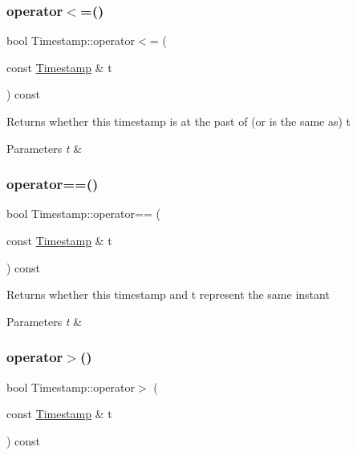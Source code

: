 \subsubsection{\texorpdfstring{operator$<$=()}{operator<=()}}
{\footnotesize\ttfamily bool Timestamp\+::operator$<$= (\begin{DoxyParamCaption}\item[{const \mbox{\hyperlink{class_d_utils_1_1_timestamp}{Timestamp}} \&}]{t }\end{DoxyParamCaption}) const}

Returns whether this timestamp is at the past of (or is the same as) t 
\begin{DoxyParams}{Parameters}
{\em t} & \\
\hline
\end{DoxyParams}
\mbox{\label{class_d_utils_1_1_timestamp_a42280e1193a6af2ac41362cf18a1185c}} 
\subsubsection{\texorpdfstring{operator==()}{operator==()}}
{\footnotesize\ttfamily bool Timestamp\+::operator== (\begin{DoxyParamCaption}\item[{const \mbox{\hyperlink{class_d_utils_1_1_timestamp}{Timestamp}} \&}]{t }\end{DoxyParamCaption}) const}

Returns whether this timestamp and t represent the same instant 
\begin{DoxyParams}{Parameters}
{\em t} & \\
\hline
\end{DoxyParams}
\mbox{\label{class_d_utils_1_1_timestamp_ad77ef43cab29f8f588bd47d74c1a8cce}} 
\subsubsection{\texorpdfstring{operator$>$()}{operator>()}}
{\footnotesize\ttfamily bool Timestamp\+::operator$>$ (\begin{DoxyParamCaption}\item[{const \mbox{\hyperlink{class_d_utils_1_1_timestamp}{Timestamp}} \&}]{t }\end{DoxyParamCaption}) const}

